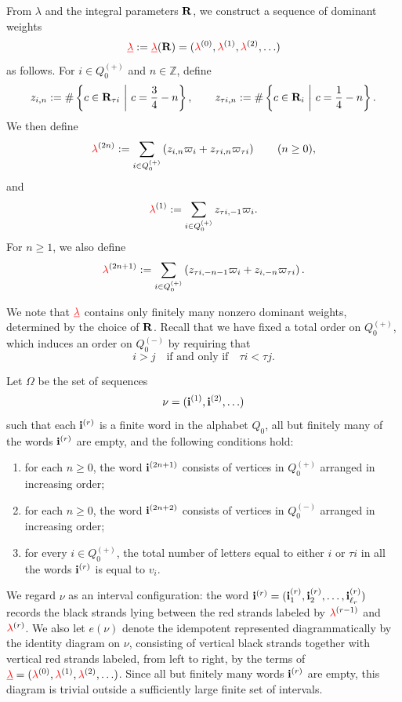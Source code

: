 From $\lambda$ and the integral parameters $\mathbf{R}$, we construct a sequence
of dominant weights
\begin{equation}
\label{eq:lamseq}
{{\color{red}\underline{\lambda}}}:={{\color{red}\underline{\lambda}}}(\mathbf{R})=({\color{red}\lambda}^{(0)},{\color{red}\lambda}^{(1)},{\color{red}\lambda}^{(2)},\ldots)
\end{equation}
as follows. For \(i\in Q_0^{(+)}\) and \(n\in\mathbb Z\), define
\[
z_{i,n}
:=
\#\left\{
c\in\mathbf{R}_{\tau i}
\ \middle|\
c=\frac34-n
\right\},
\qquad
z_{\tau i,n}
:=
\#\left\{
c\in\mathbf{R}_i
\ \middle|\
c=\frac14-n
\right\}.
\]
We then define
\[
{\color{red}\lambda}^{(2n)}
:=
\sum_{i\in Q_0^{(+)}}
\left(
z_{i,n}\varpi_i
+
z_{\tau i,n}\varpi_{\tau i}
\right)
\qquad
(n\geq0),
\]
and
\[
{\color{red}\lambda}^{(1)}
:=
\sum_{i\in Q_0^{(+)}}
z_{\tau i,-1}\varpi_i.
\]
For \(n\geq1\), we also define
\[
{\color{red}\lambda}^{(2n+1)}
:=
\sum_{i\in Q_0^{(+)}}
\left(
z_{\tau i,-n-1}\varpi_i
+
z_{i,-n}\varpi_{\tau i}
\right).
\]
\newcommand{\eint}{e_{\text{int}}}

We note that ${{\color{red}\underline{\lambda}}}$ contains only finitely many nonzero dominant weights, determined by the choice of $\mathbf{R}$. Recall that we have fixed a total order on $Q_0^{(+)}$, which induces an order on $Q_0^{(-)}$ by requiring that
\[
i>j \quad \text{if and only if} \quad \tau i < \tau j.
\]

\begin{definition}\label{Omega}
Let $\Omega$ be the set of sequences 
\[ \nu=(\mathbf{i}^{(1)},\mathbf{i}^{(2)},\ldots) \] 
such that each $\mathbf{i}^{(r)}$ is a finite word in the alphabet $Q_0$, all but finitely many of the words $\mathbf{i}^{(r)}$ are empty, and the following conditions hold: 
\begin{enumerate} 
\item for each $n\geq 0$, the word $\mathbf{i}^{(2n+1)}$ consists of vertices in $Q_0^{(+)}$ arranged in increasing order; 
\item for each $n\geq 0$, the word $\mathbf{i}^{(2n+2)}$ consists of vertices in $Q_0^{(-)}$ arranged in increasing order; 
\item for every $i\in Q_0^{(+)}$, the total number of letters equal to either $i$ or $\tau i$ in all the words $\mathbf{i}^{(r)}$ is equal to $v_i$. \end{enumerate} 
\end{definition}
We regard $\nu$ as an interval configuration: the word $\mathbf{i}^{(r)}=(\mathbf{i}^{(r)}_1,\mathbf{i}^{(r)}_2,\ldots,\mathbf{i}^{(r)}_{\ell_r})$ records
the black strands lying between the red strands labeled by ${\color{red}\lambda}^{(r-1)}$
and ${\color{red}\lambda}^{(r)}$. We also let $e(\nu)$ denote the idempotent represented
diagrammatically by the identity diagram on $\nu$, consisting of vertical
black strands together with vertical red strands labeled, from left to right,
by the terms of ${{\color{red}\underline{\lambda}}}=({\color{red}\lambda}^{(0)},{\color{red}\lambda}^{(1)},{\color{red}\lambda}^{(2)},\ldots)$.
Since all but finitely many words $\mathbf{i}^{(r)}$ are empty, this diagram is
trivial outside a sufficiently large finite set of intervals.

